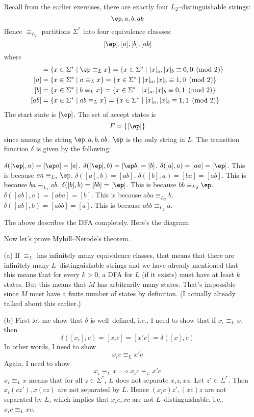 \SOLUTION
Recall from the earlier exercises, there are exactly four $L_2$--distinguishable strings:
\[
\ep, a, b, ab
\]
Hence $\equiv_{L_2}$ partitions $\Sigma^*$ into four equivalence classses:
\[
  [\ep], [a], [b], [ab]
\]
where
\begin{align*}
  [\ep] &= \{x \in \Sigma^* \mid \ep \equiv_L x \} = \{x \in \Sigma^* \mid |x|_a,|x|_b \equiv 0,0 \pmod{2} \} \\
  [a] &= \{x \in \Sigma^* \mid a \equiv_L x \} = \{x \in \Sigma^* \mid |x|_a,|x|_b \equiv 1,0 \pmod{2} \} \\
  [b] &= \{x \in \Sigma^* \mid b \equiv_L x \} = \{x \in \Sigma^* \mid |x|_a,|x|_b \equiv 0,1 \pmod{2} \} \\
  [ab] &= \{x \in \Sigma^* \mid ab \equiv_L x \} = \{x \in \Sigma^* \mid |x|_a,|x|_b \equiv 1,1 \pmod{2} \}
\end{align*}
The start state is $[\ep]$.
The set of accept states is
\[
F = \{[\ep]\}
\]
since among the string $\ep, a, b, ab$, $\ep$ is the
only string in $L$.
The transition function $\delta$ is given by the following:
\begin{enumerate}[label=\textnormal{(\alph*)},itemsep=0pt,nosep,noitemsep,partopsep=0pt,topsep=0pt,parsep=0pt]
  \li $\delta([\ep], a) = [\ep a] = [a]$.
  \li $\delta([\ep], b) = [\ep b] = [b]$.
  \li $\delta([a], a) = [aa] = [\ep]$. This is because $aa \equiv_{L_2} \ep$.
  \li $\delta([a], b) = [ab]$.
  \li $\delta([b], a) = [ba] = [ab]$. This is because $ba \equiv_{L_2} ab$.
  \li $\delta([b], b) = [bb] = [\ep]$. This is because $bb \equiv_{L_2} \ep$.
  \li $\delta([ab], a) = [aba] = [b]$. This is because $aba \equiv_{L_2} b$.
  \li $\delta([ab], b) = [abb] = [a]$. This is because $abb \equiv_{L_2} a$.
\end{enumerate}
The above describes the DFA completely.
Here's the diagram:



\newpage

Now let's prove Myhill--Nerode's theorem.

\proof
(a) If $\equiv_L$ has infinitely many equivalence classes, that means that there are
infinitely many $L$--distinguishable strings and we have already mentioned that
this means that for every $k > 0$, a DFA for $L$ (if it exists) must have at least $k$ states.
But this means that $M$ has arbitrarily many states.
That's impossible since $M$ must have a finite number of states by definition.
(I actually already talked about this earlier.)

(b)
First let me show that $\delta$ is well--defined, i.e.,
I need to show that if $x_i \equiv_L x$, then
\[
\delta([x_i], c) = [x_i c] = [x'c] = \delta([x], c)
\]
In other words, I need to show
\[
  x_i c \equiv_L x'c
\]
Again, I need to show
\[
x_i \equiv_L x \implies x_i c \equiv_L x'c 
\]
$x_i \equiv_L x$ means that for all $z \in \Sigma^*$,
$L$ does not separate $x_iz, xz$.
Let $z' \in \Sigma^*$.
Then $x_i(cz'), x(cz)$ are not separated by $L$.
Hence $(x_ic)z', (xc)z$ are not separated by $L$,
which implies that $x_ic, xc$ are not $L$--distinguishable, i.e.,
$x_ic \equiv_L xc$.

